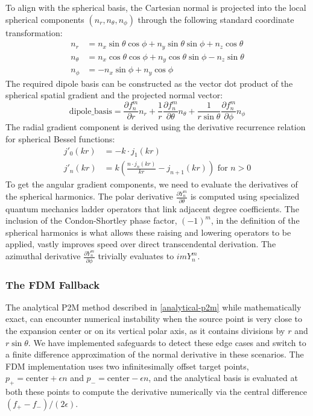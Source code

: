 To align with the spherical basis, the Cartesian normal is projected into the local spherical components $(n_r, n_\theta, n_\phi)$ through the following standard coordinate transformation:
\begin{align}
    n_r &= n_x \sin\theta \cos\phi + n_y \sin\theta \sin\phi + n_z \cos\theta \\
    n_\theta &= n_x \cos\theta \cos\phi + n_y \cos\theta \sin\phi - n_z \sin\theta \\
    n_\phi &= -n_x \sin\phi + n_y \cos\phi
\end{align}
The required dipole basis can be constructed as the vector dot product of the spherical spatial gradient and the projected normal vector:
\begin{equation}
    \text{dipole\_basis} = \frac{\partial f_n^m}{\partial r} n_r + \frac{1}{r} \frac{\partial f_n^m}{\partial \theta} n_\theta + \frac{1}{r \sin\theta} \frac{\partial f_n^m}{\partial \phi} n_\phi
\end{equation}
The radial gradient component is derived using the derivative recurrence relation for spherical Bessel functions:
\begin{align}
    j'_0(kr) &= -k \cdot j_1(kr) \\
    j'_n(kr) &= k\left( \frac{n \cdot j_n(kr)}{kr} - j_{n+1}(kr) \right) \text{ for }  n > 0
\end{align}
To get the angular gradient components, we need to evaluate the derivatives of the spherical harmonics. The polar derivative $\frac{\partial Y_n^m}{\partial \theta}$  is computed using specialized quantum mechanics ladder operators that link adjacent degree coefficients. The inclusion of the Condon-Shortley phase factor, $(-1)^m$, in the definition of the spherical harmonics is what allows these raising and lowering operators to be applied, vastly improves speed over direct transcendental derivation. The azimuthal derivative $\frac{\partial Y_n^m}{\partial \phi}$ trivially evaluates to $i m Y_n^m$. \cite{eptonmultipoletranslationtheory1995}\cite{messiah1961quantum}

\subsubsection{The \ac{FDM} Fallback} \label{subsubsec:fdm-fallback}

The analytical \ac{P2M} method described in \ref{analytical-p2m} while mathematically exact, can encounter numerical instability when the source point is very close to the expansion center or on its vertical polar axis, as it contains divisions by $r$ and $r\sin\theta$. We have implemented safeguards to detect these edge cases and switch to a finite difference approximation of the normal derivative in these scenarios. The \ac{FDM} implementation uses two infinitesimally offset target points, $p_+ = \text{center} + \epsilon n$ and $p_- = \text{center} - \epsilon n$, and the analytical basis is evaluated at both these points to compute the derivative numerically via the central difference $(f_+ - f_-) / (2\epsilon)$.

